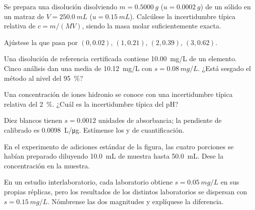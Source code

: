 \begin{exercise}[$\star$]\label{exo:b2:measurement-statistics:3}
Se prepara una disolución disolviendo $m = \qty{0.5000}{g}$ ($u = \qty{0.0002}{g}$) de un sólido en un matraz de
$V = \qty{250.0}{mL}$ ($u = \qty{0.15}{mL}$). Calcúlese la incertidumbre típica relativa de $c = m/(MV)$,
siendo la masa molar suficientemente exacta.
\end{exercise}

\begin{exercise}[$\star$]\label{exo:b2:measurement-statistics:4}
Ajústese la  que pasa por $(0, 0.02)$, $(1, 0.21)$, $(2, 0.39)$, $(3, 0.62)$.
\end{exercise}

\begin{exercise}[$\star\star$]\label{exo:b2:measurement-statistics:5}
Una disolución de referencia certificada contiene \qty{10.00}{mg/L} de un elemento. Cinco análisis dan una media de
\qty{10.12}{mg/L} con $s = \qty{0.08}{mg/L}$. ¿Está sesgado el método al nivel del 95~\%?
\end{exercise}

\begin{exercise}[$\star\star$]\label{exo:b2:measurement-statistics:6}
Una concentración de iones hidronio se conoce con una incertidumbre típica relativa del 2~\%. ¿Cuál es la
incertidumbre típica del pH?
\end{exercise}

\begin{exercise}[$\star\star$]\label{exo:b2:measurement-statistics:7}
Diez blancos tienen $s = 0.0012$ unidades de absorbancia; la pendiente de calibrado es \qty{0.0098}{L/\micro g}.
Estímense los  y de cuantificación.
\end{exercise}

\begin{exercise}[$\star\star$]\label{exo:b2:measurement-statistics:8}
En el experimento de adiciones estándar de la figura, las cuatro porciones se habían preparado diluyendo
\qty{10.0}{mL} de muestra hasta \qty{50.0}{mL}. Dese la concentración en la muestra.
\end{exercise}

\begin{exercise}[$\star\star$]\label{exo:b2:measurement-statistics:9}
En un estudio interlaboratorio, cada laboratorio obtiene $s = \qty{0.05}{mg/L}$ en sus propias réplicas, pero
los resultados de los distintos laboratorios se dispersan con $s = \qty{0.15}{mg/L}$. Nómbrense las dos magnitudes y
explíquese la diferencia.
\end{exercise}

